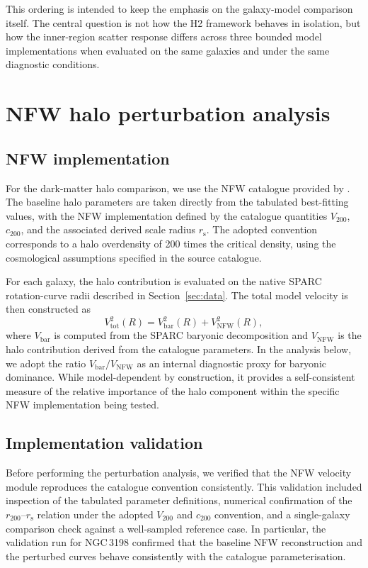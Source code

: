 \documentclass[fleqn,usenatbib]{mnras}
\begin{document}
This ordering is intended to keep the emphasis on the galaxy-model
comparison itself. The central question is not how the H2 framework
behaves in isolation, but how the inner-region scatter response differs
across three bounded model implementations when evaluated on the same
galaxies and under the same diagnostic conditions.
\section{NFW halo perturbation analysis}
\label{sec:nfw}

\subsection{NFW implementation}
\label{subsec:nfw_implementation}

For the dark-matter halo comparison, we use the NFW catalogue provided by
\citet{Li2020}. The baseline halo parameters are taken directly from the
tabulated best-fitting values, with the NFW implementation defined by the
catalogue quantities $V_{200}$, $c_{200}$, and the associated derived scale
radius $r_{\mathrm{s}}$. The adopted convention corresponds to a halo
overdensity of 200 times the critical density, using the cosmological
assumptions specified in the source catalogue.

For each galaxy, the halo contribution is evaluated on the native SPARC
rotation-curve radii described in Section~\ref{sec:data}. The total model
velocity is then constructed as
\begin{equation}
	V_{\mathrm{tot}}^2(R)
	=
	V_{\mathrm{bar}}^2(R)
	+
	V_{\mathrm{NFW}}^2(R),
\end{equation}
where $V_{\mathrm{bar}}$ is computed from the SPARC baryonic decomposition
and $V_{\mathrm{NFW}}$ is the halo contribution derived from the catalogue
parameters.
In the analysis below, we adopt the ratio
$V_{\mathrm{bar}}/V_{\mathrm{NFW}}$ as an internal diagnostic proxy for
baryonic dominance. While model-dependent by construction, it provides a
self-consistent measure of the relative importance of the halo component
within the specific NFW implementation being tested.
\subsection{Implementation validation}
\label{subsec:nfw_validation}

Before performing the perturbation analysis, we verified that the NFW
velocity module reproduces the catalogue convention consistently. This
validation included inspection of the tabulated parameter definitions,
numerical confirmation of the $r_{200}$--$r_{\mathrm{s}}$ relation under the
adopted $V_{200}$ and $c_{200}$ convention, and a single-galaxy comparison
check against a well-sampled reference case. In particular, the validation
run for NGC\,3198 confirmed that the baseline NFW reconstruction and the
perturbed curves behave consistently with the catalogue parameterisation.
\end{document}
